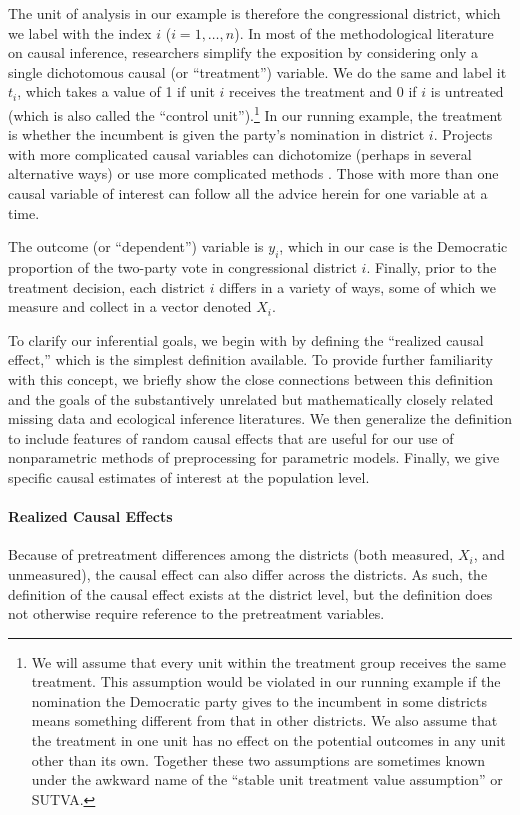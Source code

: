\documentclass[11pt,titlepage]{article}
\begin{document}
The unit of analysis in our example is therefore the congressional
district, which we label with the index $i$ ($i=1,\dots,n$).  In most
of the methodological literature on causal inference, researchers
simplify the exposition by considering only a single dichotomous
causal (or ``treatment'') variable.  We do the same and label it
$t_i$, which takes a value of 1 if unit $i$ receives the treatment and
0 if $i$ is untreated (which is also called the ``control
unit'').\footnote{We will assume that every unit within the treatment
  group receives the same treatment.  This assumption would be
  violated in our running example if the nomination the Democratic
  party gives to the incumbent in some districts means something
  different from that in other districts.  We also assume that the
  treatment in one unit has no effect on the potential outcomes in any
  unit other than its own.  Together these two assumptions are
  sometimes known under the awkward name of the ``stable unit
  treatment value assumption'' or SUTVA.}  In our running example, the
treatment is whether the incumbent is given the party's nomination in
district $i$.  Projects with more complicated causal variables can
dichotomize (perhaps in several alternative ways) or use more
complicated methods \citep{ImaDyk03}.  Those with more than one causal
variable of interest can follow all the advice herein for one variable
at a time.

The outcome (or ``dependent'') variable is $y_i$, which in our case is
the Democratic proportion of the two-party vote in congressional
district $i$.  Finally, prior to the treatment decision, each district
$i$ differs in a variety of ways, some of which we measure and collect
in a vector denoted $X_i$.

To clarify our inferential goals, we begin with by defining the
``realized causal effect,'' which is the simplest definition
available.  To provide further familiarity with this concept, we
briefly show the close connections between this definition and the
goals of the substantively unrelated but mathematically closely
related missing data and ecological inference literatures.  We then
generalize the definition to include features of random causal effects
that are useful for our use of nonparametric methods of preprocessing
for parametric models.  Finally, we give specific causal estimates of
interest at the population level.

\paragraph{Realized Causal Effects}
Because of pretreatment differences among the districts (both
measured, $X_i$, and unmeasured), the causal effect can also differ
across the districts.  As such, the definition of the causal effect
exists at the district level, but the definition does not otherwise
require reference to the pretreatment variables.
\end{document}
